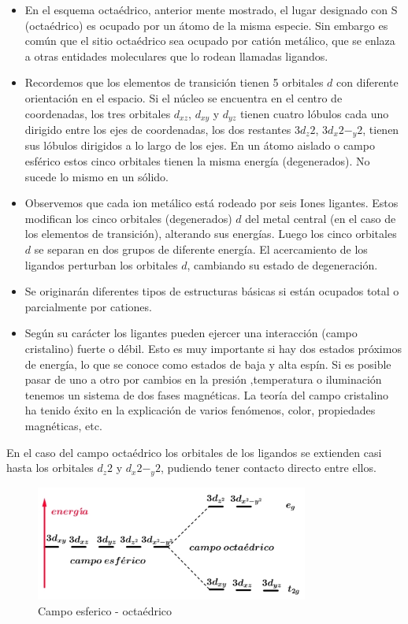 \begin{itemize}
	\item En el esquema octaédrico, anterior mente mostrado, el lugar designado con S (octaédrico) es ocupado por un átomo de la misma especie. Sin embargo es común que el sitio octaédrico sea ocupado por catión metálico, que se enlaza a otras entidades moleculares que lo rodean llamadas ligandos.
	
	\item Recordemos que los elementos de transición tienen 5 orbitales $d$ con diferente orientación en el espacio. Si el núcleo se encuentra en el centro de coordenadas, los tres orbitales $d_{xz}$, $d_{xy}$ y $d_{yz}$ tienen cuatro lóbulos cada uno dirigido entre los ejes de coordenadas, los dos restantes $3d_{z}2$, $3d_{x}2-_{y}2$, tienen sus lóbulos dirigidos a lo largo de los ejes. En un átomo aislado o campo esférico estos cinco orbitales tienen la misma energía (degenerados). No sucede lo mismo en un sólido.

	\item Observemos que cada ion metálico está rodeado por seis Iones ligantes. Estos modifican los cinco orbitales (degenerados) $d$ del metal central (en el caso de los elementos de transición), alterando sus energías. Luego los cinco orbitales $d$ se separan en dos grupos de diferente energía. El acercamiento de los ligandos perturban los orbitales $d$, cambiando su estado de degeneración.

	\item Se originarán diferentes tipos de estructuras básicas si están ocupados total o parcialmente por cationes.
	
	\item Según su carácter los ligantes pueden ejercer una interacción (campo cristalino) fuerte o débil. Esto es muy importante si hay dos estados próximos de energía, lo que se conoce como estados de baja y alta espín. Si es posible pasar de uno a otro por cambios en la presión ,temperatura o iluminación tenemos un sistema de dos fases magnéticas. La teoría del campo cristalino ha tenido éxito en la explicación de varios fenómenos, color, propiedades magnéticas, etc. 

\end{itemize}

En el caso del campo octaédrico los orbitales de los ligandos se extienden casi hasta los orbitales $d_{z}2$ y $d_{x}2-_{y}2$, pudiendo tener contacto directo entre ellos.


\begin{figure}[H]
    \centering
    \includegraphics[width=0.8\textwidth]{./Figures/campoEsferico1}
	\caption{Campo esferico - octaédrico}
	\label{fig:campoEsferico1}
\end{figure}


